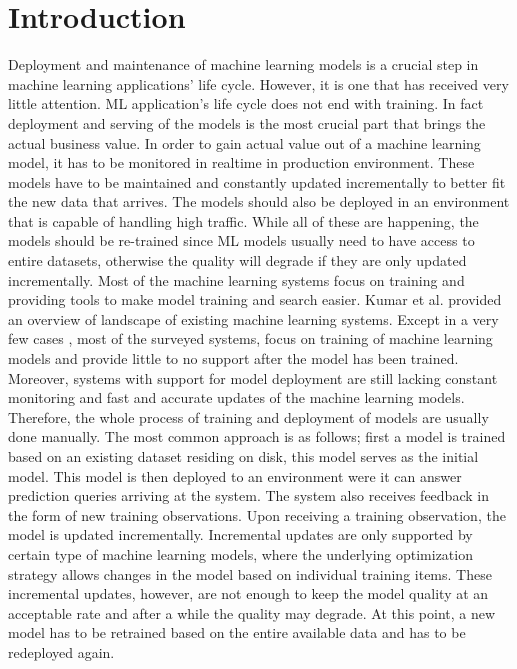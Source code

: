 \documentclass{sig-alternate-05-2015}
\begin{document}
\section{Introduction} \label{introduction}
Deployment and maintenance of machine learning models is a crucial step in machine learning applications' life cycle. 
However, it is one that has received very little attention. 
ML application's life cycle does not end with training. 
In fact deployment and serving of the models is the most crucial part that brings the actual business value. 
In order to gain actual value out of a machine learning model, it has to be monitored in realtime in production environment. 
These models have to be maintained and constantly updated incrementally to better fit the new data that arrives. 
The models should also be deployed in an environment that is capable of handling high traffic. 
While all of these are happening, the models should be re-trained since ML models usually need to have access to entire datasets, otherwise the quality will degrade if they are only updated incrementally.
Most of the machine learning systems focus on training and providing tools to make model training and search easier. 
Kumar et al. \cite{kumar2015survey} provided an overview of landscape of existing machine learning systems. 
Except in a very few cases \cite{akdere2011case, crankshaw2014missing}, most of the surveyed systems, focus on training of machine learning models and provide little to no support after the model has been trained.
Moreover, systems with support for model deployment are still lacking constant monitoring and fast and accurate updates of the machine learning models.
Therefore, the whole process of training and deployment of models are usually done manually.
The most common approach is as follows; first a model is trained based on an existing dataset residing on disk, this model serves as the initial model.
This model is then deployed to an environment were it can answer prediction queries arriving at the system.
The system also receives feedback in the form of new training observations.
Upon receiving a training observation, the model is updated incrementally.
Incremental updates are only supported by certain type of machine learning models, where the underlying optimization strategy allows changes in the model based on individual training items.
These incremental updates, however, are not enough to keep the model quality at an acceptable rate and after a while the quality may degrade.
At this point, a new model has to be retrained based on the entire available data and has to be redeployed again.
\end{document}
